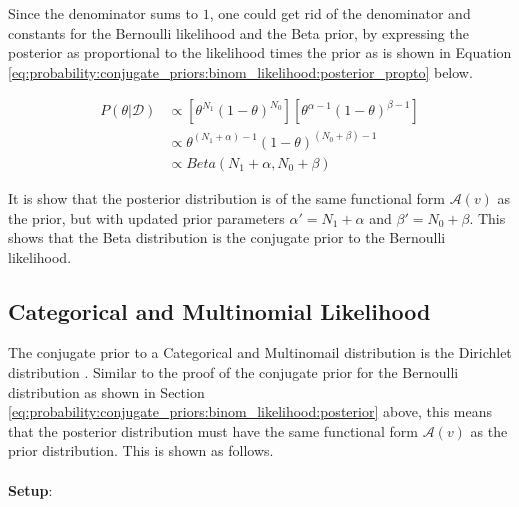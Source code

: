 Since the denominator sums to $1$, one could get rid of the denominator and constants for the Bernoulli likelihood and the Beta prior, by expressing the posterior as proportional to the likelihood times the prior as is shown in Equation \ref{eq:probability:conjugate_priors:binom_likelihood:posterior_propto} below.

\begin{equation}
    \label{eq:probability:conjugate_priors:binom_likelihood:posterior_propto}
    \begin{split}
    		P(\theta | \mathcal{D}) &\propto \left[\theta^{N_{1}}(1-\theta)^{N_{0}}\right] \left[\theta^{\alpha - 1} (1 - \theta)^{\beta - 1}\right] \\
    		&\propto \theta^{(N_{1} + \alpha) - 1}(1-\theta)^{(N_{0} + \beta) - 1} \\
    		&\propto Beta(N_{1} + \alpha, N_{0} + \beta) 
    \end{split}
\end{equation}

It is show that the posterior distribution is of the same functional form $\mathcal{A}(v)$ as the prior, but with updated prior parameters $\alpha' = N_{1} + \alpha$ and $\beta' = N_{0} + \beta$. This shows that the Beta distribution is the conjugate prior to the Bernoulli likelihood.


\subsection{Categorical and Multinomial Likelihood}
\label{sec:probability:conjugate_priors:cat_mult_likelihood}

The conjugate prior to a Categorical and Multinomail distribution is the Dirichlet distribution \cite{ref:wackerly:2014}. Similar to the proof of the conjugate prior for the Bernoulli distribution as shown in Section \ref{eq:probability:conjugate_priors:binom_likelihood:posterior} above, this means that the posterior distribution must have the same functional form $\mathcal{A}(v)$ as the prior distribution. This is shown as follows. \\\\
\textbf{Setup}:

